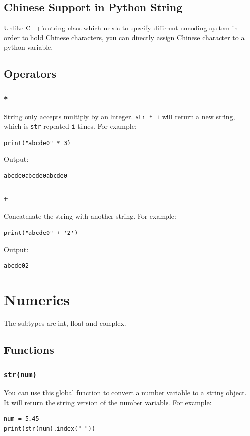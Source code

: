 \documentclass[12pt]{book}
\begin{document}
\subsection{Chinese Support in Python String}
\label{sec:orge584dd1}
Unlike C++'s string class which needs to specify different encoding system in order to hold Chinese characters, you can directly assign Chinese character to a python variable.
\subsection{Operators}
\label{sec:org010a301}
\subsubsection{\texttt{*}}
\label{sec:orgbfd5e79}
String only accepts multiply by an integer. \texttt{str * i} will return a new string, which is \texttt{str} repeated \texttt{i} times. For example:
\begin{verbatim}
print("abcde0" * 3)
\end{verbatim}
Output:
\begin{verbatim}
abcde0abcde0abcde0
\end{verbatim}
\subsubsection{\texttt{+}}
\label{sec:org90ad0ec}
Concatenate the string with another string. For example:
\begin{verbatim}
print("abcde0" + '2')
\end{verbatim}
Output:
\begin{verbatim}
abcde02
\end{verbatim}

\section{Numerics}
\label{sec:org0d6eb4b}
The subtypes are int, float and complex.
\subsection{Functions}
\label{sec:orgb598645}
\subsubsection{\texttt{str(num)}}
\label{sec:org5dfb289}
You can use this global function to convert a number variable to a string object. It will return the string version of the number variable. For example:
\begin{verbatim}
num = 5.45
print(str(num).index("."))
\end{verbatim}
\end{document}
